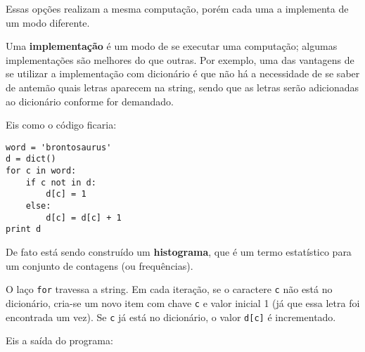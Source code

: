 Essas opções realizam a mesma computação, porém cada uma a implementa de um modo diferente.


Uma {\bf implementação} é um modo de se executar uma computação; algumas implementações são melhores do que outras. Por exemplo, uma das vantagens de se utilizar a implementação com dicionário é que não há a necessidade de se saber de antemão quais letras aparecem na string, sendo que as letras serão adicionadas ao dicionário conforme for demandado.

Eis como o código ficaria:

\beforeverb
\begin{verbatim}
word = 'brontosaurus'
d = dict()
for c in word:
    if c not in d:
        d[c] = 1
    else:
        d[c] = d[c] + 1
print d
\end{verbatim}
\afterverb
%

De fato está sendo construído um {\bf histograma}, que é um termo estatístico para um conjunto de contagens (ou frequências).


O laço {\tt for} travessa a string. Em cada iteração, se o caractere {\tt c} não está no dicionário, cria-se um novo item com chave {\tt c} e valor inicial 1 (já que essa letra foi encontrada um vez). Se {\tt c} já está no dicionário, o valor {\tt d[c]} é incrementado.


Eis a saída do programa:

